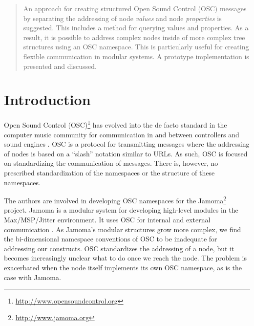 \documentclass{NIME-alternate}
\begin{document}
\maketitle



\begin{abstract}

An approach for creating structured Open Sound Control (OSC) messages by separating the addressing of node \emph{values} and node \emph{properties} is suggested. This includes a method for querying values and properties. As a result, it is possible to address complex nodes inside of more complex tree structures using an OSC namespace. This is particularly useful for creating flexible communication in modular systems.  A prototype implementation is presented and discussed.

\end{abstract}




\section{Introduction} %
\label{sec:introduction}

Open Sound Control (OSC)\footnote{\url{http://www.opensoundcontrol.org}} has evolved into the de facto standard in the computer music community for communication in and between controllers and sound engines \cite{Wright:2003}. OSC is a protocol for transmitting messages where the addressing of nodes is based on a ``slash'' notation similar to URLs. As such, OSC is focused on standardizing the communication of messages. There is, however, no prescribed standardization of the namespaces or the structure of these namespaces. 

The authors are involved in developing OSC namespaces for the Jamoma\footnote{\url{http://www.jamoma.org}} project. Jamoma is a modular system for developing high-level modules in the Max/MSP/Jitter environment. It uses OSC for internal and external communication \cite{Place:2006}.  As Jamoma's modular structures grow more complex, we find the bi-dimensional namespace conventions of OSC to be inadequate for addressing our constructs.  OSC standardizes the addressing of a node, but it becomes increasingly unclear what to do once we reach the node.  The problem is exacerbated when the node itself implements its own OSC namespace, as is the case with Jamoma.
\end{document}
